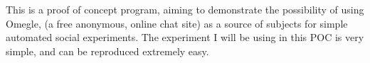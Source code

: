 

\bigskip

This is a proof of concept program, aiming to demonstrate the possibility of using Omegle, (a free
anonymous, online chat site) as a source of subjects for simple automated social experiments. The
experiment I will be using in this POC is very simple, and can be reproduced extremely easy.

\medskip



